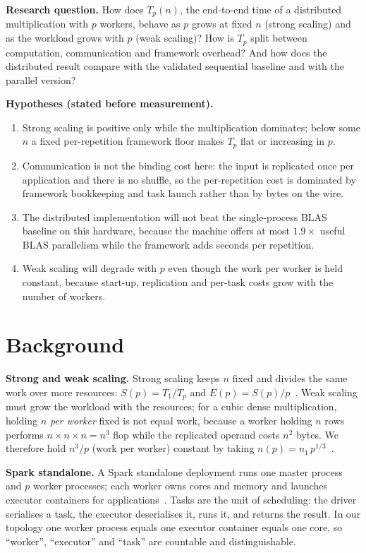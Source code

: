 \documentclass[11pt,a4paper]{article}
\begin{document}
\textbf{Research question.}
How does $T_p(n)$, the end-to-end time of a distributed multiplication
with $p$ workers, behave as $p$ grows at fixed $n$ (strong scaling) and
as the workload grows with $p$ (weak scaling)? How is $T_p$ split between
computation, communication and framework overhead? And how does the
distributed result compare with the validated sequential baseline and
with the parallel version?

\textbf{Hypotheses (stated before measurement).}
\begin{enumerate}
  \item[H1:] Strong scaling is positive only while the multiplication
        dominates; below some $n$ a fixed per-repetition framework floor
        makes $T_p$ flat or increasing in $p$.
  \item[H2:] Communication is not the binding cost here: the input is
        replicated once per application and there is no shuffle, so the
        per-repetition cost is dominated by framework bookkeeping and
        task launch rather than by bytes on the wire.
  \item[H3:] The distributed implementation will not beat the
        single-process BLAS baseline on this hardware, because the
        machine offers at most $1.9\times$ useful BLAS parallelism while
        the framework adds seconds per repetition.
  \item[H4:] Weak scaling will degrade with $p$ even though the work per
        worker is held constant, because start-up, replication and
        per-task costs grow with the number of workers.
\end{enumerate}

\section{Background}

\textbf{Strong and weak scaling.}
Strong scaling keeps $n$ fixed and divides the same work over more
resources: $S(p) = T_1/T_p$ and $E(p) = S(p)/p$~\cite{fleming1986}.
Weak scaling must grow the workload with the resources; for a cubic dense
multiplication, holding $n$ \emph{per worker} fixed is not equal work,
because a worker holding $n$ rows performs $n \times n \times n = n^3$
flop while the replicated operand costs $n^2$ bytes. We therefore hold
$n^3/p$ (work per worker) constant by taking
$n(p) = n_1 \, p^{1/3}$~\cite{mytkowicz2009}.

\textbf{Spark standalone.}
A Spark standalone deployment runs one master process and $p$ worker
processes; each worker owns cores and memory and launches executor
containers for applications~\cite{zaharia2012,sparkdoc}. Tasks are the unit of
scheduling: the driver serialises a task, the executor deserialises it,
runs it, and returns the result. In our topology one worker process
equals one executor container equals one core, so ``worker'',
``executor'' and ``task'' are countable and distinguishable.
\end{document}
